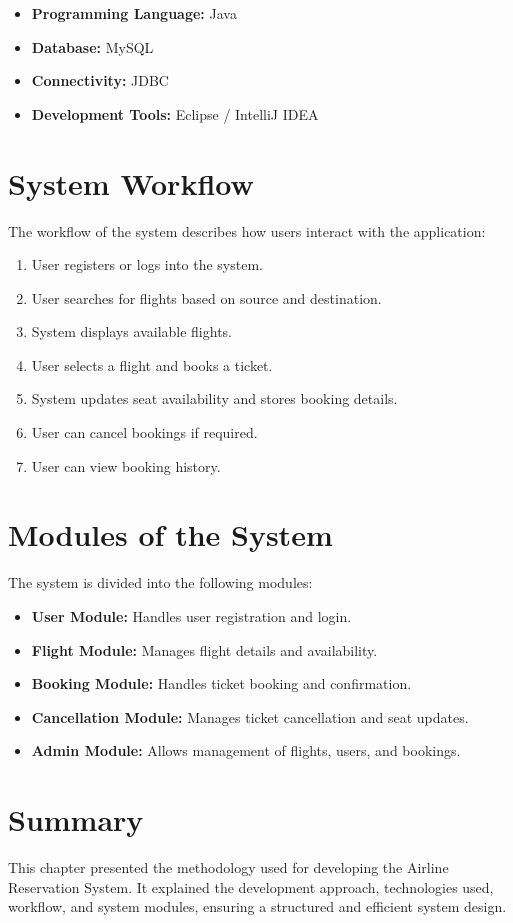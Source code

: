 \begin{itemize}
\item \textbf{Programming Language:} Java
\item \textbf{Database:} MySQL
\item \textbf{Connectivity:} JDBC
\item \textbf{Development Tools:} Eclipse / IntelliJ IDEA
\end{itemize}

\section{System Workflow}

The workflow of the system describes how users interact with the application:

\begin{enumerate}
\item User registers or logs into the system.
\item User searches for flights based on source and destination.
\item System displays available flights.
\item User selects a flight and books a ticket.
\item System updates seat availability and stores booking details.
\item User can cancel bookings if required.
\item User can view booking history.
\end{enumerate}

\section{Modules of the System}

The system is divided into the following modules:

\begin{itemize}
\item \textbf{User Module:} Handles user registration and login.

\item \textbf{Flight Module:} Manages flight details and availability.

\item \textbf{Booking Module:} Handles ticket booking and confirmation.

\item \textbf{Cancellation Module:} Manages ticket cancellation and seat updates.

\item \textbf{Admin Module:} Allows management of flights, users, and bookings.
\end{itemize}

\section{Summary}

This chapter presented the methodology used for developing the Airline Reservation System. It explained the development approach, technologies used, workflow, and system modules, ensuring a structured and efficient system design.